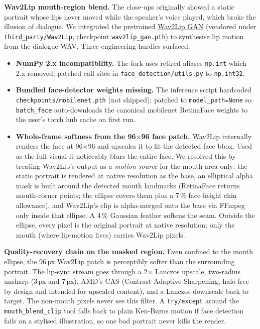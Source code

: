 \documentclass[11pt,a4paper]{article}
\newcommand{\code}[1]{\texttt{\small #1}}
\begin{document}
\textbf{Wav2Lip mouth-region blend.} The close-ups originally showed a static
portrait whose lips never moved while the speaker's voice played, which broke
the illusion of dialogue. We integrated the pretrained
\href{https://github.com/justinjohn0306/Wav2Lip}{Wav2Lip GAN} (vendored under
\code{third\_party/Wav2Lip}, checkpoint \code{wav2lip\_gan.pth}) to synthesise
lip motion from the dialogue WAV. Three engineering hurdles surfaced:

\begin{itemize}
  \item \textbf{NumPy 2.x incompatibility.} The fork uses retired aliases
        \code{np.int} which 2.x removed; patched call sites in
        \code{face\_detection/utils.py} to \code{np.int32}.
  \item \textbf{Bundled face-detector weights missing.} The inference script
        hardcoded \code{checkpoints/mobilenet.pth} (not shipped); patched to
        \code{model\_path=None} so \code{batch\_face} auto-downloads the
        canonical mobilenet RetinaFace weights to the user's torch hub cache
        on first run.
  \item \textbf{Whole-frame softness from the 96$\times$96 face patch.}
        Wav2Lip internally renders the face at 96$\times$96 and upscales it
        to fit the detected face bbox. Used as the full visual it noticeably
        blurs the entire face. We resolved this by treating Wav2Lip's output
        as a \emph{motion source} for the mouth area only: the static portrait
        is rendered at native resolution as the base, an elliptical alpha
        mask is built around the detected mouth landmarks (RetinaFace returns
        mouth-corner points; the ellipse covers them plus a 7\,\% face-height
        chin allowance), and Wav2Lip's clip is alpha-merged onto the base via
        FFmpeg only inside that ellipse. A 4\,\% Gaussian feather softens the
        seam. Outside the ellipse, every pixel is the original portrait at
        native resolution; only the mouth (where lip-motion lives) carries
        Wav2Lip pixels.
\end{itemize}

\textbf{Quality-recovery chain on the masked region.} Even confined to the
mouth ellipse, the 96\,px Wav2Lip patch is perceptibly softer than the
surrounding portrait. The lip-sync stream goes through a 2$\times$ Lanczos
upscale, two-radius unsharp (3\,px and 7\,px), AMD's CAS (Contrast-Adaptive
Sharpening, halo-free by design and intended for upscaled content), and a
Lanczos downscale back to target. The non-mouth pixels never see this filter.
A \code{try/except} around the \code{mouth\_blend\_clip} tool falls back to
plain Ken-Burns motion if face detection fails on a stylised illustration, so
one bad portrait never kills the render.
\end{document}
